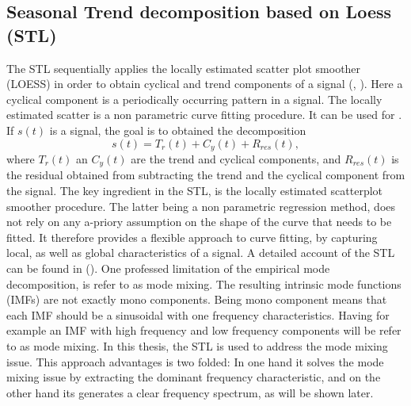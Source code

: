 \documentclass[../Main/thesis.tex]{subfiles}
\begin{document}
\justify
\subsection{Seasonal Trend decomposition based on Loess (STL)}
The STL sequentially applies the locally estimated scatter plot smoother (LOESS) in order to obtain cyclical and trend components of a signal (\cite{Cleveland-1979}, \cite{Cleveland-et-al-1988}). Here a cyclical component is a periodically occurring pattern in a signal. The  locally estimated scatter is a non parametric curve fitting procedure.  It can be used for .
If $s(t)$ is a signal, the goal is to obtained the decomposition 
\begin{equation}
s(t) = T_{r}(t) + C_{y}(t) + R_{res}(t),
\end{equation} 
where $T_{r}(t)$ an $C_{y}(t)$ are the trend and cyclical components, and $R_{res}(t)$ is the residual obtained from subtracting  the trend and the cyclical component from the signal. The key ingredient in the STL, is the locally estimated scatterplot smoother procedure. The latter being a non parametric regression method, does not rely on any a-priory assumption on the shape of the curve that needs to be fitted. It therefore provides a flexible approach to curve fitting, by capturing local, as well as global characteristics of a signal. A detailed account of the STL can be found in  (\cite{Cleveland-et-al-1990}).
\justify
One  professed limitation of the empirical mode decomposition, is refer to as mode mixing. The resulting intrinsic mode functions (IMFs) are not exactly mono components. Being mono component means that each IMF should be a sinusoidal with one frequency characteristics. Having for example an IMF with high frequency and low frequency components will be refer to as mode mixing. In this thesis, the STL is used to address the mode mixing issue. This approach advantages is two folded: In one hand it solves the mode mixing issue by extracting the dominant frequency characteristic, and on the other hand its generates a clear frequency spectrum, as will be shown later.
\end{document}
